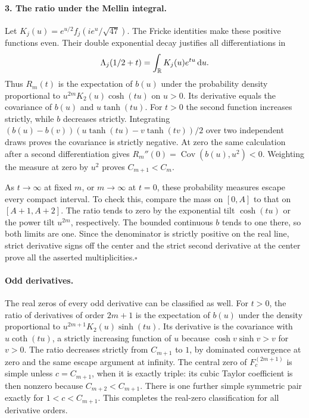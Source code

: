 \paragraph{3. The ratio under the Mellin integral.}
Let $K_j(u)=e^{u/2} f_j(ie^u/\sqrt{47})$. The Fricke identities make these positive functions even. Their double exponential decay justifies all differentiations in
\[
 \Lambda_j(1/2+t)=\int_{\mathbb R}K_j(u)e^{tu}\,\mathrm d u.
\]
Thus $R_m(t)$ is the expectation of $b(u)$ under the probability density proportional to $u^{2m}K_2(u)\cosh(tu)$ on $u>0$. Its derivative equals the covariance of $b(u)$ and $u\tanh(tu)$. For $t>0$ the second function increases strictly, while $b$ decreases strictly. Integrating $(b(u)-b(v))(u\tanh(tu)-v\tanh(tv))/2$ over two independent draws proves the covariance is strictly negative. At zero the same calculation after a second differentiation gives $R_m''(0)=\operatorname{Cov}(b(u),u^2)<0$. Weighting the measure at zero by $u^2$ proves $C_{m+1}<C_m$.

As $t\to\infty$ at fixed $m$, or $m\to\infty$ at $t=0$, these probability measures escape every compact interval. To check this, compare the mass on $[0,A]$ to that on $[A+1,A+2]$. The ratio tends to zero by the exponential tilt $\cosh(tu)$ or the power tilt $u^{2m}$, respectively. The bounded continuous $b$ tends to one there, so both limits are one. Since the denominator is strictly positive on the real line, strict derivative signs off the center and the strict second derivative at the center prove all the asserted multiplicities.\hfill$\square$

\paragraph{Odd derivatives.}
The real zeros of every odd derivative can be classified as well. For $t>0$, the ratio of derivatives of order $2m+1$ is the expectation of $b(u)$ under the density proportional to $u^{2m+1}K_2(u)\sinh(tu)$. Its derivative is the covariance with $u\coth(tu)$, a strictly increasing function of $u$ because $\cosh v\sinh v>v$ for $v>0$. The ratio decreases strictly from $C_{m+1}$ to $1$, by dominated convergence at zero and the same escape argument at infinity. The central zero of $F_c^{(2m+1)}$ is simple unless $c=C_{m+1}$, when it is exactly triple: its cubic Taylor coefficient is then nonzero because $C_{m+2}<C_{m+1}$. There is one further simple symmetric pair exactly for $1<c<C_{m+1}$. This completes the real-zero classification for all derivative orders.

